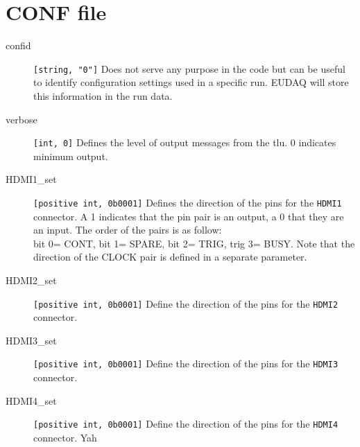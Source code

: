 \section{CONF file}
\begin{description}
  \item[confid] \verb|[string, "0"]| Does not serve any purpose in the code but can be useful to identify configuration settings used in a specific run. EUDAQ will store this information in the run data.
  \item[verbose] \verb|[int, 0]| Defines the level of output messages from the \gls{tlu}. 0 indicates minimum output.
  \item[HDMI1\_set] \verb|[positive int, 0b0001]| Defines the direction of the pins for the \verb|HDMI1| connector. A 1 indicates that the pin pair is an output, a 0 that they are an input. The order of the pairs is as follow:\\
  bit 0= CONT, bit 1= SPARE, bit 2= TRIG, trig 3= BUSY. Note that the direction of the CLOCK pair is defined in a separate parameter.
  \item[HDMI2\_set] \verb|[positive int, 0b0001]| Define the direction of the pins for the \verb|HDMI2| connector.
  \item[HDMI3\_set] \verb|[positive int, 0b0001]| Define the direction of the pins for the \verb|HDMI3| connector.
  \item[HDMI4\_set] \verb|[positive int, 0b0001]| Define the direction of the pins for the \verb|HDMI4| connector. Yah
\end{description} 